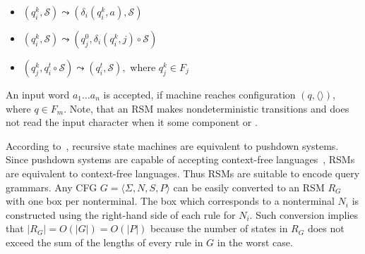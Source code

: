 \begin{itemize}
    \item $(q_i^k,\mathcal{S}) \leadsto (\delta_i (q_i^k, a),\mathcal{S})$
    \item $(q_i^k,\mathcal{S}) \leadsto (q_j^0, \delta_i (q_i^k, j) \circ\mathcal{S})$
    \item $(q_j^k,q_i^t\circ \mathcal{S}) \leadsto (q_i^t, \mathcal{S}),$ where $q_j^k \in F_j$
\end{itemize}

An input word $a_1 \dots a_n$ is accepted, if machine reaches configuration $(q,\langle\rangle)$, where $q \in F_m$.
Note, that an RSM makes nondeterministic transitions and does not read the input character when it  some component or .

According to~\cite{rsm:analysis:10.1007/3-540-44585-4_18}, recursive state machines are equivalent to pushdown systems.
Since pushdown systems are capable of accepting context-free languages~\cite{automata:theory:10.5555/1177300}, RSMs are equivalent to context-free languages.
Thus RSMs are suitable to encode query grammars.
Any CFG $G=\langle\Sigma, N, S, P\rangle$ can be easily converted to an RSM $R_G$ with one box per nonterminal.
The box which corresponds to a nonterminal $N_i$ is constructed using the right-hand side of each rule for $N_i$.
Such conversion implies that $|R_G| = O(|G|) = O(|P|)$ because the number of states in $R_G$ does not exceed the sum of the lengths of every rule in $G$ in the worst case.

